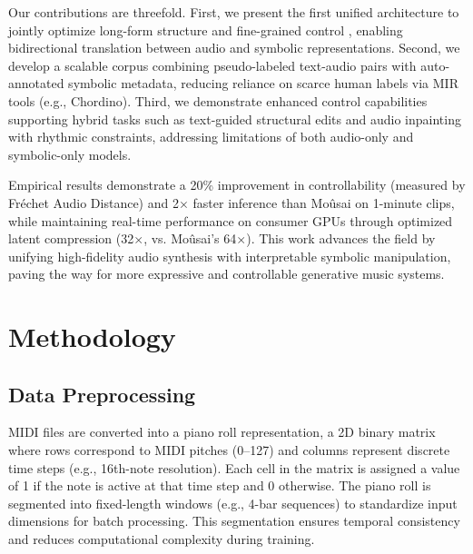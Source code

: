 \documentclass[conference]{IEEEtran}
\begin{document}
Our contributions are threefold. First, we present the first unified architecture to jointly optimize long-form structure \cite{schneider2023mousaitexttomusicgenerationlongcontext} and fine-grained control \cite{melechovsky2024mustangocontrollabletexttomusicgeneration}, enabling bidirectional translation between audio and symbolic representations. Second, we develop a scalable corpus combining pseudo-labeled text-audio pairs with auto-annotated symbolic metadata, reducing reliance on scarce human labels via MIR tools (e.g., Chordino). Third, we demonstrate enhanced control capabilities supporting hybrid tasks such as text-guided structural edits and audio inpainting with rhythmic constraints, addressing limitations of both audio-only \cite{huang2023noise2musictextconditionedmusicgeneration} and symbolic-only \cite{zhang2022sdmusestochasticdifferentialmusic} models.  

Empirical results demonstrate a 20\% improvement in controllability (measured by Fréchet Audio Distance) and 2$\times$ faster inference than Moûsai \cite{schneider2023mousaitexttomusicgenerationlongcontext} on 1-minute clips, while maintaining real-time performance on consumer GPUs through optimized latent compression (32$\times$, vs. Moûsai's 64$\times$). This work advances the field by unifying high-fidelity audio synthesis with interpretable symbolic manipulation, paving the way for more expressive and controllable generative music systems.

\section{Methodology}
\label{sec:methodology}

\subsection{Data Preprocessing}
MIDI files are converted into a piano roll representation, a 2D binary matrix where rows correspond to MIDI pitches (0–127) and columns represent discrete time steps (e.g., 16th-note resolution). Each cell in the matrix is assigned a value of 1 if the note is active at that time step and 0 otherwise. The piano roll is segmented into fixed-length windows (e.g., 4-bar sequences) to standardize input dimensions for batch processing. This segmentation ensures temporal consistency and reduces computational complexity during training.
\end{document}
